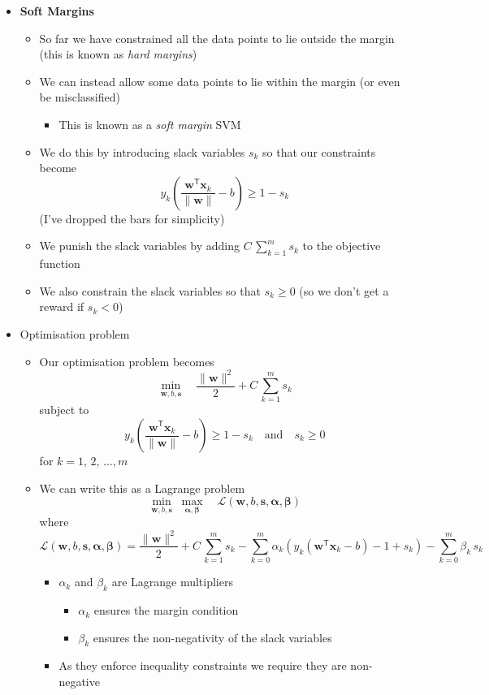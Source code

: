 \documentclass[11pt]{article}
\newcommand{\tr}{\textsf{T}}
\begin{document}
\begin{itemize}
\item \textbf{Soft Margins}
\begin{itemize}
\item So far we have constrained all the data points to lie outside
the margin (this is known as \emph{hard margins})
\item We can instead allow some data points to lie within the margin
(or even be misclassified)
\begin{itemize}
\item This is known as a \emph{soft margin} SVM
\end{itemize}
\item We do this by introducing slack variables \(s_k\) so that our
constraints become
$$ y_k \left(\frac{ \bm{w}^\tr \bm{x}_k}{\|\bm{w}\|} -b \right)
       \geq 1 - s_k $$
(I've dropped the bars for simplicity)
\item We punish the slack variables by adding \(C\,\sum\limits_{k=1}^m
       s_k\) to the objective function
\item We also constrain the slack variables so that \(s_k\geq0\) (so we
don't get a reward if \(s_k<0\))
\end{itemize}
\item Optimisation problem
\begin{itemize}
\item Our optimisation problem becomes 
$$ \min_{\bm{w},b,\bm{s}} \quad \frac{ \|\bm{w}\|^2 }{2} + C \, \sum_{k=1}^m s_k $$
 subject to
 $$  y_k \left(\frac{ \bm{w}^\tr \bm{x}_k}{\|\bm{w}\|} -b \right)
       \geq 1 - s_k  \quad \text{and} \quad s_k\geq0 $$
for \(k=1,\,2,\,\ldots,m\)
\item We can write this as a Lagrange problem
$$  \min_{\bm{w},b,\bm{s}} \; \max_{\bm{\alpha},\bm{\beta}} \quad
       \mathcal{L}(\bm{w}, b, \bm{s},\bm{\alpha}, \bm{\beta}) $$
where
$$ \mathcal{L}(\bm{w}, b, \bm{s},\bm{\alpha}, \bm{\beta}) =
       \frac{\|\bm{w}\|^2}{2} + C \, \sum_{k=1}^m s_k -  \sum_{k=0}^m
       \alpha_k \left(y_k \left( \bm{w}^\tr \bm{x}_k - b \right) - 1+
       s_k \right) - \sum_{k=0}^m         \beta_k \, s_k $$
\begin{itemize}
\item \(\alpha_k\) and \(\beta_k\) are Lagrange multipliers
\begin{itemize}
\item \(\alpha_k\) ensures the margin condition
\item \(\beta_k\) ensures the non-negativity of the slack variables
\end{itemize}
\item As they enforce inequality constraints we require they are
non-negative
\end{itemize}
\end{itemize}
\end{itemize}
\end{document}
